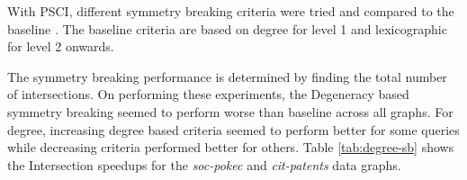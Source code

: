 {With PSCI, different symmetry breaking criteria were tried and compared to the baseline \cite{PARSEC_VD}. The baseline criteria are based on degree for level 1 and lexicographic for level 2 onwards.

The symmetry breaking performance is determined by finding the total number of intersections.
On performing these experiments, the Degeneracy based symmetry breaking seemed to perform worse than baseline across all graphs.
For degree, increasing degree based criteria seemed to perform better for some queries while decreasing criteria performed better for others.
Table \ref{tab:degree-sb} shows the Intersection speedups for the \textit{soc-pokec} and \textit{cit-patents} data graphs.

\begin{table}[h]
    \centering


\end{table}}
